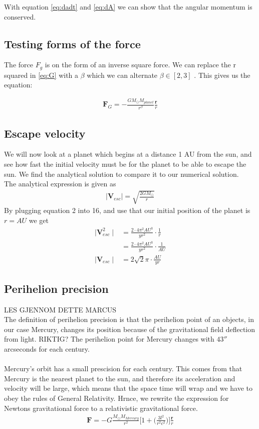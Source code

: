 \documentclass{article}
\begin{document}
With equation \ref{eq:dadt} and \ref{eq:dA} we can show that the angular momentum is conserved.

\subsection{Testing forms of the force}

The force $F_g$ is on the form of an inverse square force. We can replace the r squared in \ref{eq:G} with a $\beta$ which we can alternate $\beta \in [2,3]$ . This gives us the equation:

\begin{align}
    \mathbf{F}_G=-\frac{GM_{\odot}M_{planet}}{r^{\beta}}\frac{\mathbf{r}}{r}
    \label{eq:F_b}
\end{align}

\subsection{Escape velocity}
We will now look at a planet which begins at a distance 1 AU from the sun, 
and see how fast the initial velocity must be for the planet to be able to escape the sun. We find the analytical solution to compare it to our numerical solution. \\
The analytical expression is given as 
\begin{align}
    \mid{\mathbf{V}_{esc}}\mid=\sqrt{\frac{2GM_{\odot}}{r}}
\end{align}
By plugging equation 2 into 16, and use that our initial position of the planet is $r=AU$ we get
\begin{align}
\mid{\mathbf{V}_{esc}^2}\mid&=\frac{2\cdot 4\pi^2AU^3}{yr^2}\cdot\frac{1}{r}\\
&=\frac{2\cdot 4\pi^2AU^3}{yr^2}\cdot\frac{1}{AU}\\
\mid{\mathbf{V}_{esc}}\mid&=2\sqrt{2}\pi\cdot\frac{AU}{yr}
\end{align}
\subsection{Perihelion precision}
LES GJENNOM DETTE MARCUS\\
The definition of perihelion precision is that the perihelion point of an objects, in our case Mercury, changes its position because of 
the gravitational field deflection from light. RIKTIG? The perihelion point for Mercury changes with $43''$ arcseconds for each century. \\
\\
Mercury's orbit has a small prescision for each century. This comes from that Mercury is the nearest planet to the sun, and therefore its acceleration and velocity will be large, which means that the space time will wrap    and we have to obey the rules of General Relativity. Hrnce, we rewrite the expression for Newtons gravitational force to a relativistic gravitational force.
\begin{align}
    \mathbf{F}=-G\frac{M_{\odot}M_{Mercury}}{r^2}\Bigg[1+\Bigg(\frac{3l^2}{r^2c^2}\bigg)\bigg]\frac{\mathbf{r}}{r}
\end{align}
\end{document}
